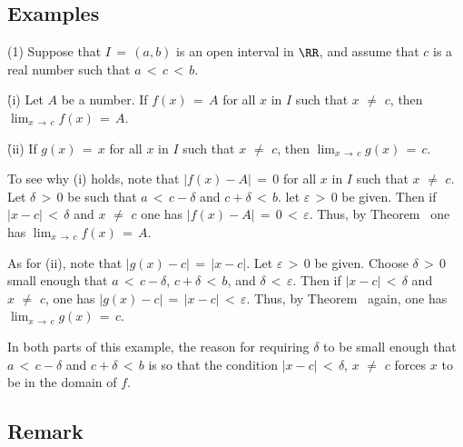 {            \subsection{\small{\bf Examples}}
            \label{ExampC90.20}

\hspace*{\parindent}(1) Suppose that $I \,=\, (a,b)$ is an open interval in ${\RR}$, and assume that $c$ is a real number such that $a\,<\,c\,<\,b$.

\V

        \h (i) Let $A$ be a number. If $f(x) \,=\, A$ for all $x$ in $I$ such that $x \,\,{\neq}\,\, c$,
    then ${\displaystyle \lim_{x \,{\rightarrow}\, c} f(x) \,=\, A}$.

        \h (ii) If $g(x) \,=\, x$ for all $x$ in $I$ such that $x \,\,{\neq}\,\, c$, then ${\displaystyle \lim_{x \,{\rightarrow}\, c} g(x) \,=\, c}$.

\V

        To see why (i) holds, note that $|f(x)-A| \,=\, 0$ for all $x$ in $I$ such that $x \,\,{\neq}\,\, c$.
    Let ${\delta}\,>\,0$ be such that $a\,<\,c-{\delta}$ and $c+{\delta}\,<\,b$.
    let ${\varepsilon}\,>\,0$ be given.
    Then if $|x-c|\,<\,{\delta}$ and $x \,\,{\neq}\,\, c$ one has $|f(x)-A| \,=\, 0\,<\,{\varepsilon}$.
    Thus, by Theorem~ one has ${\displaystyle \lim_{x \,{\rightarrow}\, c} f(x) \,=\, A}$.

        As for (ii), note that $|g(x)-c| \,=\, |x-c|$. Let ${\varepsilon}\,>\,0$ be given.
    Choose ${\delta}\,>\,0$ small enough that $a\,<\,c-{\delta}$, $c+{\delta}\,<\,b$, and ${\delta}\,<\,{\varepsilon}$.
    Then if $|x-c|\,<\,{\delta}$ and $x \,\,{\neq}\,\, c$, one has $|g(x)-c| \,=\, |x-c|\,<\,{\varepsilon}$.
    Thus, by Theorem~ again, one has ${\displaystyle \lim_{x \,{\rightarrow}\, c} g(x) \,=\, c}$.

        In both parts of this example, the reason for requiring ${\delta}$ to be small enough that $a\,<\,c-{\delta}$ and $c+{\delta}\,<\,b$ is so that the condition $|x-c|\,<\,{\delta}$, $x \,\,{\neq}\,\, c$ forces $x$ to be in the domain of $f$.
    

\V
\V


            \subsection{\small{\bf Remark}}
            \label{RemrkC90.30}


}
